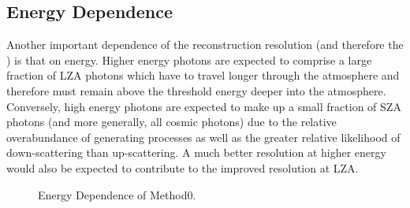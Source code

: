 \documentclass[main.tex]{subfiles}
\begin{document}
\subsection{Energy Dependence}
Another important dependence of the reconstruction resolution (and therefore the \rse\hspace{-4pt}) is that on energy. Higher energy photons are expected to comprise a large fraction of LZA photons which have to travel longer through the atmosphere and therefore must remain above the threshold energy deeper into the atmosphere. Conversely, high energy photons are expected to make up a small fraction of SZA photons (and more generally, all cosmic photons) due to the relative overabundance of generating processes as well as the greater relative likelihood of down-scattering than up-scattering. A much better resolution at higher energy would also be expected to contribute to the improved resolution at LZA.

\begin{figure}[htbp]
  \centering
  \caption{Energy Dependence of Method0.}
  \label{fig:energy_reg}
\end{figure}
\end{document}

